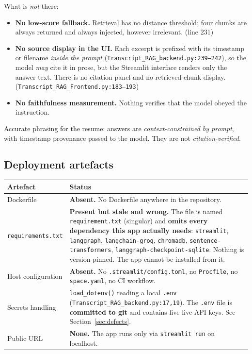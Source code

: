 \documentclass[11pt,a4paper]{article}
\begin{document}
\noindent What is \emph{not} there:
\begin{itemize}
  \item \textbf{No low-score fallback.} Retrieval has no distance threshold; four
        chunks are always returned and always injected, however irrelevant.
        (line 231)
  \item \textbf{No source display in the UI.} Each excerpt is prefixed with its
        timestamp or filename \emph{inside the prompt}
        (\texttt{Transcript\_RAG\_backend.py:239--242}), so the model \emph{may}
        cite it in prose, but the Streamlit interface renders only the answer
        text. There is no citation panel and no retrieved-chunk display.
        (\texttt{Transcript\_RAG\_Frontend.py:183--193})
  \item \textbf{No faithfulness measurement.} Nothing verifies that the model
        obeyed the instruction.
\end{itemize}

\noindent
Accurate phrasing for the resume: answers are \emph{context-constrained by
prompt}, with timestamp provenance passed to the model. They are not
\emph{citation-verified}.

\subsection{Deployment artefacts}

\begin{longtable}{@{}p{5cm}p{10.5cm}@{}}
\toprule
\textbf{Artefact} & \textbf{Status} \\
\midrule
\endhead
Dockerfile & \textbf{Absent.} No Dockerfile anywhere in the repository. \\
\texttt{requirements.txt} & \textbf{Present but stale and wrong.} The file is named
\texttt{requirement.txt} (singular) and \textbf{omits every dependency this app
actually needs}: \texttt{streamlit}, \texttt{langgraph},
\texttt{langchain-groq}, \texttt{chromadb}, \texttt{sentence-transformers},
\texttt{langgraph-checkpoint-sqlite}. Nothing is version-pinned. The app cannot be
installed from it. \\
Host configuration & \textbf{Absent.} No \texttt{.streamlit/config.toml}, no
\texttt{Procfile}, no \texttt{space.yaml}, no CI workflow. \\
Secrets handling & \texttt{load\_dotenv()} reading a local \texttt{.env}
(\texttt{Transcript\_RAG\_backend.py:17,19}). The \texttt{.env} file is
\textbf{committed to git} and contains five live API keys. See
Section~\ref{sec:defects}. \\
Public URL & \textbf{None.} The app runs only via \texttt{streamlit run} on
localhost. \\
\bottomrule
\end{longtable}
\end{document}
